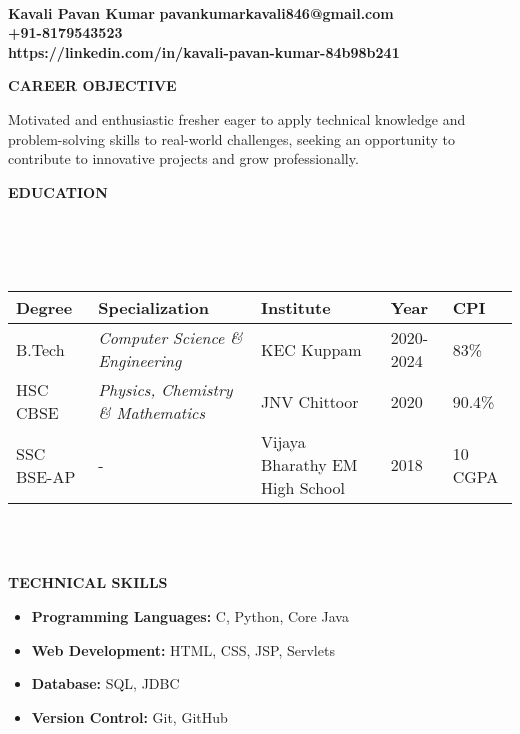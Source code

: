 \documentclass[a4paper,10pt]{article}
\newcommand{\lsep}{-0.5cm}
\newcommand{\resheading}[1]{{\small \colorbox{mygrey}{\begin{minipage}{0.975\textwidth}{\textbf{#1 \vphantom{p\^{E}}}}\end{minipage}}}}
\begin{document}
\hspace{0.5cm}\\[-1.8cm]

\textbf{Kavali Pavan Kumar} \hspace{8cm} {\bf pavankumarkavali846@gmail.com}\\
  \hspace{12cm} {\bf +91-8179543523} \\
  \hspace{3.3cm} {\bf https://linkedin.com/in/kavali-pavan-kumar-84b98b241} \\

\vspace{-2mm}
\resheading{\textbf{CAREER OBJECTIVE}}
\begin{itemize}
\noindent 
Motivated and enthusiastic fresher eager to apply technical knowledge and problem-solving skills to real-world challenges, seeking an opportunity to contribute to innovative projects and grow professionally.
\end{itemize}

\vspace{-2mm}
\resheading{\textbf{EDUCATION} }\\[\lsep]\\ \\
\indent \begin{tabular}{ p{2.5cm} @{\hskip 0.15in} p{5.5cm} @{\hskip 0.15in} p{3.5cm} @{\hskip 0.15in} p{2.5cm} @{\hskip 0.15in} p{1.5cm} }
\toprule
\textbf{Degree} & \textbf{Specialization} & \textbf{Institute} & \textbf{Year} & \textbf{CPI} \\
\midrule
B.Tech & \textit{Computer Science \& Engineering} & KEC Kuppam & 2020-2024 & 83\% \\
HSC CBSE & \textit{Physics, Chemistry \& Mathematics} & JNV Chittoor & 2020 & 90.4\% \\ 
SSC BSE-AP & - & Vijaya Bharathy EM High School & 2018 & 10 CGPA \\
\bottomrule
\end{tabular}
\\ \\

\resheading{\textbf{TECHNICAL SKILLS} }
\begin{itemize}
\vspace{-1mm}
\item \textbf{Programming Languages:} C, Python, Core Java
\vspace{-1mm}
\item \textbf{Web Development:} HTML, CSS, JSP, Servlets
\vspace{-1mm}
\item \textbf{Database:} SQL, JDBC
\vspace{-1mm}
\item \textbf{Version Control:} Git, GitHub
\end{itemize}
\end{document}
